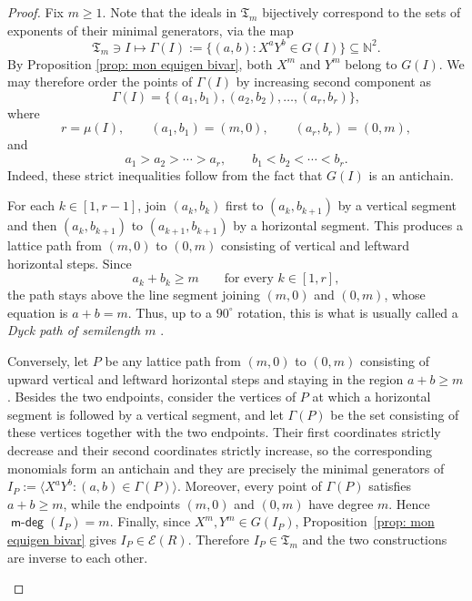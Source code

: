 \documentclass[a4paper,10pt,reqno]{amsart}
\theoremstyle{definition}
\theoremstyle{definition}
\DeclareMathOperator{\mdeg}{\mathsf {m-deg}}
\begin{document}
\begin{proof}
    Fix $m\ge 1$. Note that the ideals in $\mathfrak T_m$ bijectively correspond to the sets of exponents of their minimal generators, via the map
    \[ \mathfrak T_m\ni I \mapsto \Gamma(I) := \{(a,b)\colon X^aY^b\in G(I)\}\subseteq \mathbb N^2. \]
By Proposition \ref{prop: mon equigen bivar}, both $X^m$ and $Y^m$ belong to $G(I)$. We may therefore order the points of $\Gamma(I)$ by increasing second component as
    \[\Gamma(I)=\{(a_1,b_1),(a_2,b_2),\ldots,(a_r,b_r)\},\]
    where
    \[
        r=\mu(I), \qquad(a_1,b_1)=(m,0),
        \qquad
        (a_r,b_r)=(0,m),
    \]
    and
    \[
        a_1>a_2>\cdots>a_r,
        \qquad
        b_1<b_2<\cdots<b_r.
    \]
    Indeed, these strict inequalities follow from the fact that
    $G(I)$ is an antichain.

    For each $k\in[1,r-1]$, join $(a_k,b_k)$ first to
    $(a_k,b_{k+1})$ by a vertical segment and then
    $(a_k,b_{k+1})$ to $(a_{k+1},b_{k+1})$ by a horizontal segment.
    This produces a lattice path from $(m,0)$ to $(0,m)$ consisting of
    vertical and leftward horizontal steps. Since
    \[        a_k+b_k\ge m
        \qquad\text{for every }k\in[1,r],
    \]
    the path stays above the line segment joining $(m,0)$ and $(0,m)$, whose equation is $a+b=m$. Thus, up to a $90^{\circ}$ rotation, this is what is usually called a \emph{Dyck path of semilength $m$} \cite[Chapter 1.5]{StaCat}.

    Conversely, let $P$ be any lattice path from $(m,0)$ to $(0,m)$ consisting of upward vertical and leftward horizontal steps and staying in the region $a+b\ge m$. Besides the two endpoints, consider the vertices of $P$ at which a horizontal segment is followed by a vertical segment, and let $\Gamma(P)$ be the set consisting of these vertices together with the two endpoints. Their first coordinates strictly decrease and their second coordinates strictly increase, so the corresponding monomials form an antichain and they are precisely the minimal generators of $I_P:=\langle X^aY^b:(a,b)\in\Gamma(P)\rangle$. Moreover, every point of $\Gamma(P)$ satisfies $a+b\ge m$, while the endpoints $(m,0)$ and $(0,m)$ have degree $m$. Hence $\mdeg(I_P)=m$. Finally, since $X^m,Y^m\in G(I_P)$, Proposition~\ref{prop: mon equigen bivar} gives $I_P\in\mathcal E(R)$. Therefore $I_P\in\mathfrak T_m$ and the two constructions are inverse to each other. 


\begin{figure}[ht]
\centering
{}
\end{figure}
\end{proof}
\end{document}
